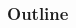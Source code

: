 \begin{frame}
  \titlepage
\end{frame}

\begin{frame}[t]
  \frametitle{Outline}
  \begin{columns}[T]
    \begin{column}{.5\textwidth}
      \tableofcontents[sections={1-2}]
    \end{column}
    \begin{column}{.5\textwidth}
      \tableofcontents[sections={3-}]
    \end{column}
  \end{columns}
\end{frame}